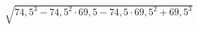 \begin{ex}[type=calculate]
	\begin{condition}
		\( \sqrt{74,5^3-74,5^2\cdot69,5-74,5\cdot69,5^2+69,5^3} \)
	\end{condition}
\end{ex}